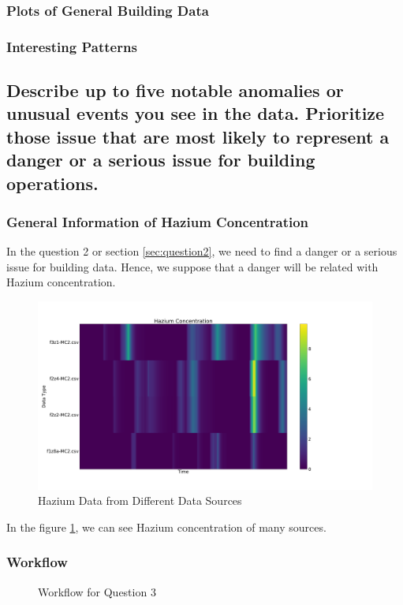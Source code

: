 \documentclass[aps, 10pt, a4paper]{article}
\begin{document}
            \subsubsection{Plots of General Building Data}
            
            \subsubsection{Interesting Patterns}
        
        \subsection[Question 3]{Describe up to five notable anomalies or unusual events you see in the data. Prioritize those issue that are most likely to represent a danger or a serious issue for building operations.}
            \label{sec:question3}
            \subsubsection{General Information of Hazium Concentration}
                In the question 2 or section \ref{sec:question2}, we need to find a danger or a serious issue for building data. Hence, we suppose that a danger will be related with Hazium concentration.
                
                \begin{figure}[htbp]
                    \centering
                    \includegraphics[width=0.4 \linewidth]{figures/hazium.png}
                    \caption{Hazium Data from Different Data Sources}
                    \label{fig:generalhazium}
                \end{figure}
            
                In the figure \ref{fig:generalhazium}, we can see Hazium concentration of many sources. 

            \subsubsection{Workflow}
                \begin{figure}[htbp]
                    \centering
                    \begin{tikzpicture}[node distance = 2cm, auto]
                    \end{tikzpicture}
                    \caption{Workflow for Question 3}
                    \label{fig:workflow3}
                \end{figure}
            
\end{document}
